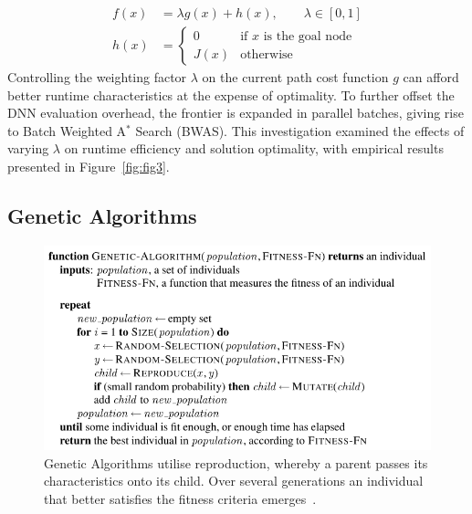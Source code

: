 \documentclass[UKenglish]{libraries/svproc}
\begin{document}
\begin{align*}
  f(x)&=\lambda g(x)+h(x),\qquad\lambda\in [0,1] \\
  h(x)&=
  \begin{cases}
    0    & \text{if $x$ is the goal node} \\
    J(x) & \text{otherwise}
  \end{cases}
\end{align*}
Controlling the weighting factor $\lambda$ on the current path cost function $g$ can afford better runtime characteristics at the expense of optimality. To further offset the DNN evaluation overhead, the frontier is expanded in parallel batches, giving rise to Batch Weighted A$^\ast$ Search (BWAS).  This investigation examined the effects of varying $\lambda$ on runtime efficiency and solution optimality, with empirical results presented in Figure~\ref{fig:fig3}.

\subsection{Genetic Algorithms}

\begin{figure}
\centering
\includegraphics[width=0.9\linewidth]{images/genetic-algorithm}
\caption{Genetic Algorithms utilise reproduction, whereby a parent passes its characteristics onto its child. Over several generations an individual that better satisfies the fitness criteria emerges~\cite{10.5555/1671238}.}
\label{fig:fig0}
\end{figure}
\end{document}
